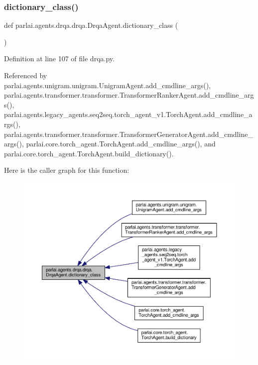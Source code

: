 \subsubsection{\texorpdfstring{dictionary\+\_\+class()}{dictionary\_class()}}
{\footnotesize\ttfamily def parlai.\+agents.\+drqa.\+drqa.\+Drqa\+Agent.\+dictionary\+\_\+class (\begin{DoxyParamCaption}{ }\end{DoxyParamCaption})\hspace{0.3cm}{\ttfamily [static]}}



Definition at line 107 of file drqa.\+py.



Referenced by parlai.\+agents.\+unigram.\+unigram.\+Unigram\+Agent.\+add\+\_\+cmdline\+\_\+args(), parlai.\+agents.\+transformer.\+transformer.\+Transformer\+Ranker\+Agent.\+add\+\_\+cmdline\+\_\+args(), parlai.\+agents.\+legacy\+\_\+agents.\+seq2seq.\+torch\+\_\+agent\+\_\+v1.\+Torch\+Agent.\+add\+\_\+cmdline\+\_\+args(), parlai.\+agents.\+transformer.\+transformer.\+Transformer\+Generator\+Agent.\+add\+\_\+cmdline\+\_\+args(), parlai.\+core.\+torch\+\_\+agent.\+Torch\+Agent.\+add\+\_\+cmdline\+\_\+args(), and parlai.\+core.\+torch\+\_\+agent.\+Torch\+Agent.\+build\+\_\+dictionary().

Here is the caller graph for this function\+:
\nopagebreak
\begin{figure}[H]
\begin{center}
\leavevmode
\includegraphics[width=350pt]{classparlai_1_1agents_1_1drqa_1_1drqa_1_1DrqaAgent_a1d925f46a6b35d1f10cb033a1184841d_icgraph}
\end{center}
\end{figure}
\mbox{\label{classparlai_1_1agents_1_1drqa_1_1drqa_1_1DrqaAgent_a17be110f5f7cba058238fae60a420507}} 
